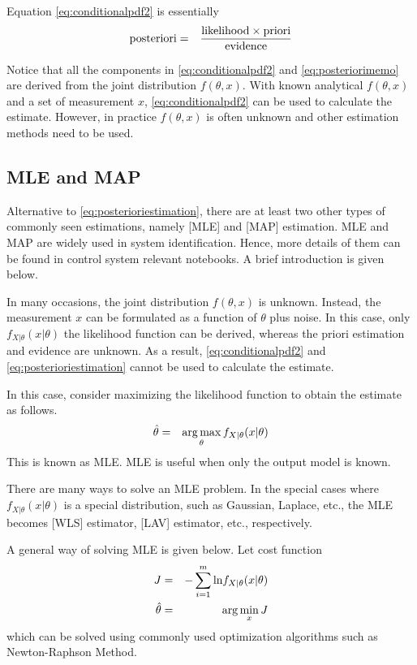 Equation \eqref{eq:conditionalpdf2} is essentially
\begin{eqnarray}
	\textup{posteriori} &=& \dfrac{\textup{likelihood}\times\textup{priori}}{\textup{evidence}} \label{eq:posteriorimemo}
\end{eqnarray} 

Notice that all the components in \eqref{eq:conditionalpdf2} and \eqref{eq:posteriorimemo} are derived from the joint distribution $f(\theta, x)$. With known analytical $f(\theta, x)$ and a set of measurement $x$, \eqref{eq:conditionalpdf2} can be used to calculate the estimate. However, in practice $f(\theta, x)$ is often unknown and other estimation methods need to be used.

\subsection{MLE and MAP}

Alternative to \eqref{eq:posterioriestimation}, there are at least two other types of commonly seen estimations, namely [MLE] and [MAP] estimation. MLE and MAP are widely used in system identification. Hence, more details of them can be found in control system relevant notebooks. A brief introduction is given below.

In many occasions, the joint distribution $f(\theta, x)$ is unknown. Instead, the measurement $x$ can be formulated as a function of $\theta$ plus noise. In this case, only $f_{X|\theta}(x|\theta)$ the likelihood function can be derived, whereas the priori estimation and evidence are unknown. As a result, \eqref{eq:conditionalpdf2} and \eqref{eq:posterioriestimation} cannot be used to calculate the estimate.

In this case, consider maximizing the likelihood function to obtain the estimate as follows.
\begin{eqnarray}
	\hat{\theta} &=& \operatorname*{arg\,max}_\theta f_{X|\theta}(x|\theta) \nonumber
\end{eqnarray}
This is known as MLE. MLE is useful when only the output model is known.


There are many ways to solve an MLE problem. In the special cases where $f_{X|\theta}(x|\theta)$ is a special distribution, such as Gaussian, Laplace, etc., the MLE becomes [WLS] estimator, [LAV] estimator, etc., respectively.

A general way of solving MLE is given below. Let cost function
\begin{eqnarray}
	J &=& -\sum_{i=1}^{m}\textup{ln}f_{X|\theta}(x|\theta) \nonumber \\
	\hat{\theta} &=& \arg\min_{x} J \nonumber
\end{eqnarray}
which can be solved using commonly used optimization algorithms such as Newton-Raphson Method.

